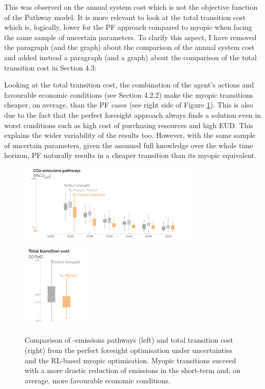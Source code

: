 \documentclass[12pt,a4paper]{article}
\begin{document}
\noindent This was observed on the annual system cost which is not the objective function of the Pathway model. It is more relevant to look at the total transition cost which is, logically, lower for the PF approach compared to myopic when facing the same sample of uncertain parameters. To clarify this aspect, I have removed the paragraph (and the graph) about the comparison of the annual system cost and added instead a paragraph (and a graph) about the comparison of the total transition cost {\color{blue}in Section 4.3}:

\begin{mdframed}[style=manuscript] %
Looking at the total transition cost, the combination of the agent's actions and favourable economic conditions (see Section 4.2.2) make the myopic transitions cheaper, on average, than the PF cases (see right side of Figure \ref{fig:Gwp_pathway_total_tran_cost}). This is also due to the fact that the perfect foresight approach always finds a solution even in worst conditions such as high cost of purchasing resources and high EUD. This explains the wider variability of the results too. However, with the same sample of uncertain parameters, given the assumed full knowledge over the whole time horizon, PF naturally results in a cheaper transition than its myopic equivalent.
\end{mdframed}

\begin{figure}[!htbp]
\centering
\includegraphics[height=4cm]{Gwp_pathway_core.pdf}
\includegraphics[height=4cm]{Transition_cost_comp_2.pdf}
\caption{Comparison of -emissions pathways (left) and total transition cost (right) from the perfect foresight optimisation under uncertainties and the RL-based myopic optimisation. Myopic transitions succeed with a more drastic reduction of emissions in the short-term and, on average, more favourable economic conditions.}
\label{fig:Gwp_pathway_total_tran_cost}
\end{figure}
\end{document}
